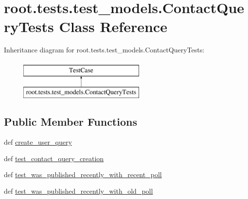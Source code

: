 \hypertarget{classroot_1_1tests_1_1test__models_1_1_contact_query_tests}{\section{root.\-tests.\-test\-\_\-models.\-Contact\-Query\-Tests Class Reference}
\label{classroot_1_1tests_1_1test__models_1_1_contact_query_tests}
}
Inheritance diagram for root.\-tests.\-test\-\_\-models.\-Contact\-Query\-Tests\-:\begin{figure}[H]
\begin{center}
\leavevmode
\includegraphics[height=2.000000cm]{classroot_1_1tests_1_1test__models_1_1_contact_query_tests}
\end{center}
\end{figure}
\subsection*{Public Member Functions}
\begin{DoxyCompactItemize}
\item 
def \hyperlink{classroot_1_1tests_1_1test__models_1_1_contact_query_tests_a92eca738635e0e938117a037ddd20ca5}{create\-\_\-user\-\_\-query}
\item 
def \hyperlink{classroot_1_1tests_1_1test__models_1_1_contact_query_tests_ac31752f725d8683bdcfec6c5ba466bf6}{test\-\_\-contact\-\_\-query\-\_\-creation}
\item 
def \hyperlink{classroot_1_1tests_1_1test__models_1_1_contact_query_tests_a9dd66f7ab02c98af4247512eee331253}{test\-\_\-was\-\_\-published\-\_\-recently\-\_\-with\-\_\-recent\-\_\-poll}
\item 
def \hyperlink{classroot_1_1tests_1_1test__models_1_1_contact_query_tests_ae3d303a3977f901b10f46e995e543a95}{test\-\_\-was\-\_\-published\-\_\-recently\-\_\-with\-\_\-old\-\_\-poll}
\end{DoxyCompactItemize}



